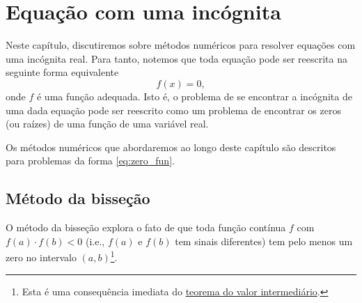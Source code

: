 
\chapter{Equação com uma incógnita}\label{cap_eq1d}
\thispagestyle{fancy}

Neste capítulo, discutiremos sobre métodos numéricos para resolver equações com uma incógnita real. Para tanto, notemos que toda equação pode ser reescrita na seguinte forma equivalente
\begin{equation}\label{eq:zero_fun}
  f(x) = 0,
\end{equation}
onde $f$ é uma função adequada. Isto é, o problema de se encontrar a incógnita de uma dada equação pode ser reescrito como um problema de encontrar os zeros (ou raízes) de uma função de uma variável real.

Os métodos numéricos que abordaremos ao longo deste capítulo são descritos para problemas da forma \eqref{eq:zero_fun}.

\section{Método da bisseção}\label{cap_eq1d_sec_bissec}\label{método da!bisseção}

O método da bisseção explora o fato de que toda função contínua $f$ com $f(a)\cdot f(b) < 0$ (i.e., $f(a)$ e $f(b)$ tem sinais diferentes) tem pelo menos um zero no intervalo $(a, b)$\footnote{Esta é uma consequência imediata do \href{https://phkonzen.github.io/notas/AnaliseMatematicaI/cap_continuidade_sec_prop_f_cont.html}{teorema do valor intermediário}.}.

